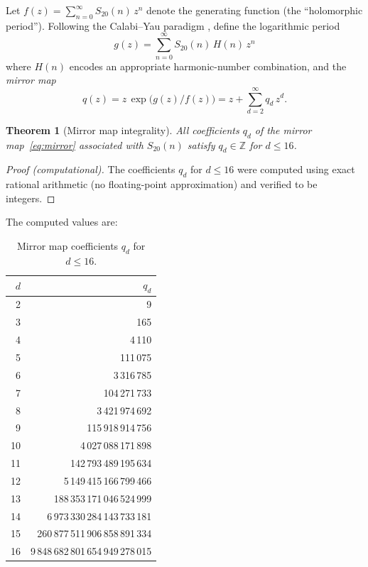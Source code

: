 \documentclass[12pt,reqno]{amsart}
\theoremstyle{plain}
\newtheorem{theorem}{Theorem}[section]
\theoremstyle{definition}
\theoremstyle{remark}
\newcommand{\ZZ}{\mathbb{Z}}
\begin{document}
Let $f(z) = \sum_{n=0}^{\infty} S_{20}(n)\, z^n$ denote the
generating function (the ``holomorphic period'').
Following the Calabi--Yau paradigm \cite{LianYau1996,AESZ},
define the logarithmic period
\[
g(z) = \sum_{n=0}^{\infty} S_{20}(n)\, H(n)\, z^n
\]
where $H(n)$ encodes an appropriate harmonic-number combination,
and the \emph{mirror map}
\begin{equation}\label{eq:mirror}
q(z) = z\,\exp\!\bigl(g(z)/f(z)\bigr)
= z + \sum_{d=2}^{\infty} q_d\, z^d.
\end{equation}

\begin{theorem}[Mirror map integrality]\label{thm:mirror}
All coefficients $q_d$ of the mirror map~\eqref{eq:mirror}
associated with $S_{20}(n)$ satisfy $q_d \in \ZZ$ for
$d \le 16$.
\end{theorem}

\begin{proof}[Proof (computational)]
The coefficients $q_d$ for $d \le 16$ were computed using
exact rational arithmetic (no floating-point approximation)
and verified to be integers.
\end{proof}

\noindent
The computed values are:

\begin{table}[ht]
\centering
\caption{Mirror map coefficients $q_d$ for $d \le 16$.}
\label{tab:mirror}
\smallskip
\begin{tabular}{r r}
\toprule
$d$ & $q_d$ \\
\midrule
2 & 9 \\
3 & 165 \\
4 & 4\,110 \\
5 & 111\,075 \\
6 & 3\,316\,785 \\
7 & 104\,271\,733 \\
8 & 3\,421\,974\,692 \\
9 & 115\,918\,914\,756 \\
10 & 4\,027\,088\,171\,898 \\
11 & 142\,793\,489\,195\,634 \\
12 & 5\,149\,415\,166\,799\,466 \\
13 & 188\,353\,171\,046\,524\,999 \\
14 & 6\,973\,330\,284\,143\,733\,181 \\
15 & 260\,877\,511\,906\,858\,891\,334 \\
16 & 9\,848\,682\,801\,654\,949\,278\,015 \\
\bottomrule
\end{tabular}
\end{table}
\end{document}
